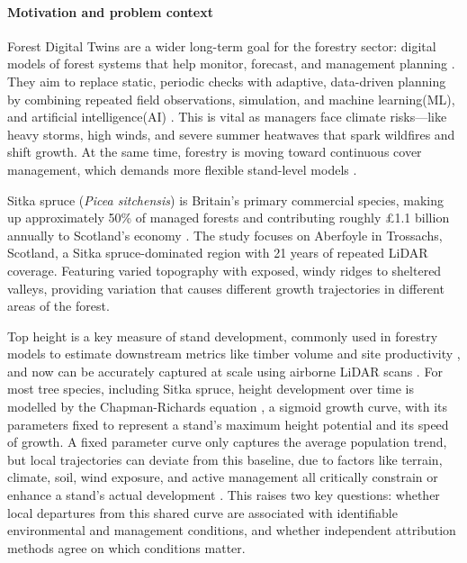 \documentclass[logo,msc,ai]{infthesis}           %
\begin{document}
\paragraph*{Motivation and problem context}
Forest Digital Twins are a wider long-term goal for the forestry sector: digital models of forest systems that help monitor, forecast, and  management planning \cite{baskent2026Review_C1_SS, buonocore2022Proposal_C1_SS}. They aim to replace static, periodic checks with adaptive, data-driven planning by combining repeated field observations, simulation, and machine learning(ML), and artificial intelligence(AI) \cite{baskent2026Review_C1_SS, buonocore2022Proposal_C1_SS}. This is vital as managers face climate risks—like heavy storms, high winds, and severe summer heatwaves that spark wildfires and shift growth. At the same time, forestry is moving toward continuous cover management, which demands more flexible stand-level models \cite{ForestResearch2009Evidence_C1_SS}.

Sitka spruce (\textit{Picea sitchensis}) is Britain's primary commercial species, making up approximately 50\% of managed forests \cite{ForestResearch2026Sitka_C1_SS} and contributing roughly \pounds1.1 billion annually to Scotland's economy \cite{ScottishForestry2026Future_C1_SS, mason2011Sitka_C1_SS}. The study focuses on Aberfoyle in Trossachs, Scotland, a Sitka spruce-dominated region with 21 years of repeated LiDAR coverage. Featuring varied topography with exposed, windy ridges to sheltered valleys, providing variation that causes different growth trajectories in different areas of the forest.

Top height is a key measure of stand development, commonly used in forestry models to estimate downstream metrics like timber volume and site productivity \cite{ForestResearch2026Sitka_C1_SS}, and now can be accurately captured at scale using airborne LiDAR scans \cite{suarezminguez2008Practical_C1_SS}. For most tree species, including Sitka spruce, height development over time is modelled by the Chapman-Richards equation \cite{pommerening2015Methods_C2_CR}, a sigmoid growth curve, with its parameters fixed to represent a stand's maximum height potential and its speed of growth. A fixed parameter curve only captures the average population trend, but local trajectories can deviate from this baseline, due to factors like terrain, climate, soil, wind exposure, and active management all critically constrain or enhance a stand's actual development \cite{socha2023Higher_C1_SS, cameron2015Building_C1_SS}.  This raises two key questions: whether local departures from this shared curve are associated with identifiable environmental and management conditions, and whether independent attribution methods agree on which conditions matter.
\end{document}
